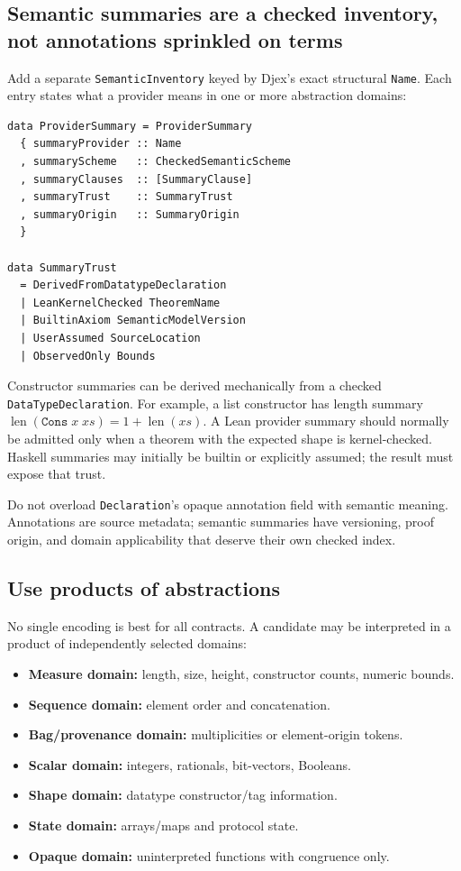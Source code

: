 \documentclass[11pt,oneside]{article}
\newcommand{\code}[1]{\texttt{#1}}
\begin{document}
\subsection{Semantic summaries are a checked inventory, not annotations sprinkled on terms}

Add a separate \code{SemanticInventory} keyed by Djex's exact structural \code{Name}.
Each entry states what a provider means in one or more abstraction domains:

\begin{lstlisting}[language=HaskellExt,caption={Provider summary sketch}]
data ProviderSummary = ProviderSummary
  { summaryProvider :: Name
  , summaryScheme   :: CheckedSemanticScheme
  , summaryClauses  :: [SummaryClause]
  , summaryTrust    :: SummaryTrust
  , summaryOrigin   :: SummaryOrigin
  }

data SummaryTrust
  = DerivedFromDatatypeDeclaration
  | LeanKernelChecked TheoremName
  | BuiltinAxiom SemanticModelVersion
  | UserAssumed SourceLocation
  | ObservedOnly Bounds
\end{lstlisting}

Constructor summaries can be derived mechanically from a checked
\code{DataTypeDeclaration}. For example, a list constructor has length summary
$\operatorname{len}(\texttt{Cons}\;x\;xs)=1+\operatorname{len}(xs)$. A Lean provider
summary should normally be admitted only when a theorem with the expected shape is
kernel-checked. Haskell summaries may initially be builtin or explicitly assumed; the
result must expose that trust.

Do not overload \code{Declaration}'s opaque annotation field with semantic meaning.
Annotations are source metadata; semantic summaries have versioning, proof origin,
and domain applicability that deserve their own checked index.

\subsection{Use products of abstractions}

No single encoding is best for all contracts. A candidate may be interpreted in a
product of independently selected domains:

\begin{itemize}
  \item \textbf{Measure domain:} length, size, height, constructor counts, numeric bounds.
  \item \textbf{Sequence domain:} element order and concatenation.
  \item \textbf{Bag/provenance domain:} multiplicities or element-origin tokens.
  \item \textbf{Scalar domain:} integers, rationals, bit-vectors, Booleans.
  \item \textbf{Shape domain:} datatype constructor/tag information.
  \item \textbf{State domain:} arrays/maps and protocol state.
  \item \textbf{Opaque domain:} uninterpreted functions with congruence only.
\end{itemize}
\end{document}
